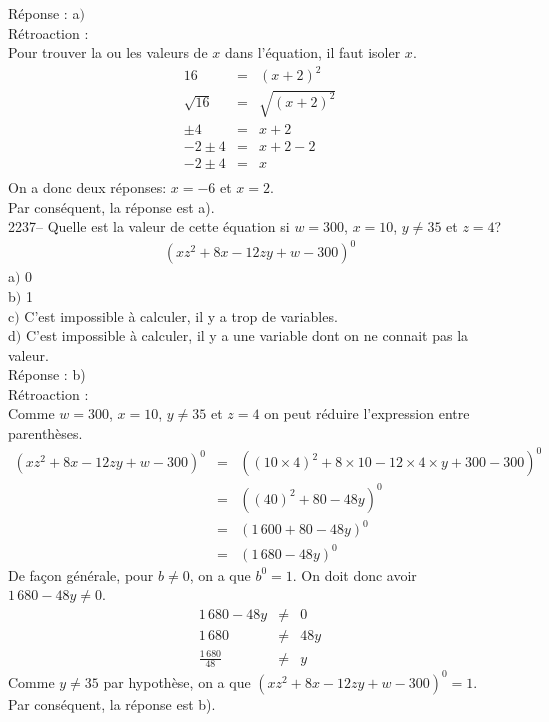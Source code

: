 \documentclass[letterpaper, 12pt]{article}
\begin{document}
R\'eponse : a$)$\\

R\'etroaction :\\
Pour trouver la ou les valeurs de $x$ dans l'\'equation, il faut isoler $x$.
\begin{eqnarray*}
  16&=&(x+2)^{2}\\
  \sqrt{16}&=&\sqrt{(x+2)^{2}}\\
  \pm4&=&x+2\\
  -2\pm4&=&x+2-2\\
  -2\pm4&=&x\\
\end{eqnarray*}
On a donc deux r\'eponses: $x=-6$ et $x=2$.\\
Par cons\'equent, la r\'eponse est a).\\

2237-- Quelle est la valeur de cette \'equation si $w=300$, $x=10$, $y\neq35$ et $z=4$?
\begin{eqnarray*}
(xz^{2}+8x-12zy+w -300)^{0}
\end{eqnarray*}
a$)$ 0\\
b$)$ 1\\
c$)$ C'est impossible \`a calculer, il y a trop de variables.\\
d$)$ C'est impossible \`a calculer, il y a une variable dont on ne connait pas la valeur.\\

R\'eponse : b)\\

R\'etroaction :\\
Comme $w=300$, $x=10$, $y\neq35$ et $z=4$ on peut r\'eduire l'expression entre parenth\`eses.
\begin{eqnarray*}
 (xz^{2}+8x-12zy+w -300)^{0}&=&((10\times 4)^{2}+8\times 10-12\times 4 \times y + 300 -300)^{0}\\
&=&((40)^{2}+80-48y)^{0}\\
&=&(1\,600+80-48y)^{0}\\
&=&(1\,680-48y)^{0}
\end{eqnarray*}
De fa\c con g\'en\'erale, pour $b\neq0$, on a que $b^{0}=1$. On doit donc avoir $1\,680-48y\neq0$.
\begin{eqnarray*}
 1\,680-48y&\neq&0\\
 1\,680&\neq&48y\\
 \frac{1\,680}{48}&\neq&y
\end{eqnarray*}
Comme $y\neq35$ par hypoth\`ese, on a que $(xz^{2}+8x-12zy+w -300)^{0}=1$. \\
Par cons\'equent, la r\'eponse est b).\\
\end{document}

